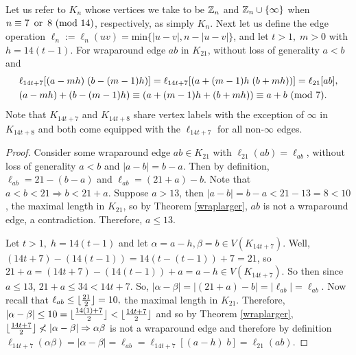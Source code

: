 \begin{thm}\label{genmaps}
    Let us refer to $K_{n}$ whose vertices we take to be $\mathbb{Z}_{n}$ and $\mathbb{Z}_{n}\cup \{\infty\}$ when $n\equiv 7\,\text{ or }\,8\ (\mathrm{mod}\ 14)$, respectively, as simply $K_{n}$. Next let us define the edge operation $\ell_{n}:=\ell_{n}(uv)=\mathrm{min}\{|u-v|,n-|u-v|\}$, and let $t>1,\;m>0$ with $h = 14(t-1)$. For wraparound edge $ab$ in $K_{21}$, without loss of generality $a<b$ and\begin{align*}
        &\ell_{14t+7}[(a-mh)\;(b-(m-1)h)]=\ell_{14t+7}[(a+(m-1)h\;(b+mh))]=\ell_{21}[ab],\\
        &(a-mh)+(b-(m-1)h) \equiv (a+(m-1)h + (b+mh)) \equiv a+b\ (\mathrm{mod}\ 7).\\
    \end{align*} Note that $K_{14t+7}$ and $K_{14t+8}$ share vertex labels with the exception of $\infty$ in $K_{14t+8}$ and both come equipped with the $\ell_{14t+7}$ for all non-$\infty$ edges.

    \begin{proof}
        Consider some wraparound edge $ab\in K_{21}$ with $\ell_{21}(ab)=\ell_{ab}$, without loss of generality $a<b$ and $|a-b|=b-a$. Then by definition, $\ell_{ab}=21-(b-a)$ and $\ell_{ab}=(21+a)-b$. Note that $a<b<21\Rightarrow b<21+a$. Suppose $a>13$, then $|a-b|=b-a<21-13=8<10$, the maximal length in $K_{21}$, so by Theorem \ref{wraplarger}, $ab$ is not a wraparound edge, a contradiction. Therefore, $a\leq 13.$

        Let $t>1,\;h = 14(t-1)$ and let $\alpha = a-h,\beta=b\in V(K_{14t+7})$. Well, $(14t+7)-(14(t-1))=14(t-(t-1))+7=21$, so $21+a = (14t+7)-(14(t-1))+a = a-h\in V(K_{14t+7})$. So then since $a\leq 13$, $21+a\leq 34<14t+7$. So, $|\alpha-\beta| = |(21+a)-b|=|\ell_{ab}|=\ell_{ab}.$ Now recall that $\ell_{ab}\leq \lfloor\frac{21}{2}\rfloor=10,$ the maximal length in $K_{21}$. Therefore, $|\alpha-\beta|\leq 10 = \lfloor\frac{14(1)+7}{2}\rfloor<\lfloor\frac{14t+7}{2}\rfloor$ and so by Theorem \ref{wraplarger}, $ \floor{\frac{14t+7}{2}}\not<|\alpha-\beta|\Rightarrow \alpha\beta$ is not a wraparound edge and therefore by definition $\ell_{14t+7}(\alpha\beta) = |\alpha-\beta|=\ell_{ab}= \ell_{14t+7}[(a-h)\;b] = \ell_{21}(ab)$. 
        

\end{proof}
\end{thm}
